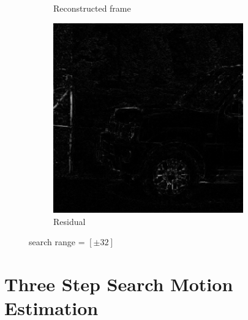 \documentclass{homework}
\begin{document}
\begin{figure}[H]
\begin{subfigure}{0.32\textwidth}
        \caption{Reconstructed frame}
    \end{subfigure}
    \begin{subfigure}{0.32\textwidth}
        \centering
        \includegraphics[width=0.9\textwidth]{8_32_residual.png}
        \caption{Residual}
    \end{subfigure}
    \caption{search range = $[\pm 32]$}
\end{figure}

\section*{Three Step Search Motion Estimation}
\end{document}
